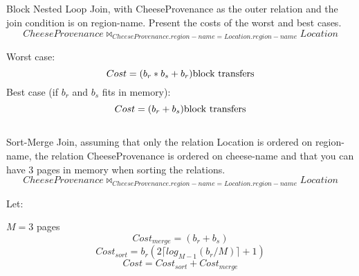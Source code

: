 	

	\subsection{}
	{\color{gray} Block Nested Loop Join, with CheeseProvenance as the outer relation and the join condition is on region-name. Present the costs of the worst and best cases.}
	\begin{equation}CheeseProvenance \bowtie_{CheeseProvenance.region-name=Location.region-name} Location\end{equation}

	Worst case:
	\begin{equation}Cost = (b_r * b_s + b_r) $block transfers$\end{equation}
	Best case (if $b_r$ and $b_s$ fits in memory):
	\begin{equation}Cost = (b_r + b_s) $block transfers$\end{equation}
	

	\subsection{}
	{\color{gray}Sort-Merge Join, assuming that only the relation Location is ordered on region-name, the relation CheeseProvenance is ordered on cheese-name and that you can have 3 pages in memory when sorting the relations.}
	\begin{equation}CheeseProvenance \bowtie_{CheeseProvenance.region-name=Location.region-name} Location\end{equation}

	Let:

	\tab $M = 3$ pages
	\begin{equation}Cost_{merge} = (b_r + b_s) \end{equation}
	\begin{equation}Cost_{sort} = b_r(2\lceil log_{M-1}(b_r/M) \rceil+1) \end{equation}
	\begin{equation}Cost = Cost_{sort} + Cost_{merge} \end{equation}	


